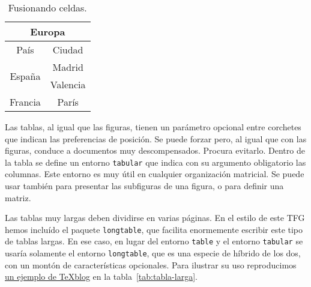 \begin{table}[htb] 
\centering
\begin{tabular}{|c|c|}
\hline
\multicolumn{2}{|c|}{Europa} \\
\hline
País  & Ciudad \\ \hline \hline
\multirow{2}{1.2cm}{España} & Madrid \\ \cline{2-2}
& Valencia \\ \hline
Francia & París \\ \hline
\end{tabular}
\caption{Fusionando celdas.}
\label{tab:dificililla}
\end{table}

Las tablas, al igual que las figuras, tienen un parámetro opcional entre corchetes que indican las preferencias de posición.  Se puede forzar pero, al igual que con las figuras, conduce a documentos muy descompensados.  Procura evitarlo.  Dentro de la tabla se define un entorno \texttt{tabular} que indica con su argumento obligatorio las columnas.  Este entorno es muy útil en cualquier organización matricial.  Se puede usar también para presentar las subfiguras de una figura, o para definir una matriz.

Las tablas muy largas deben dividirse en varias páginas.  En el estilo de este TFG hemos incluído el paquete \texttt{longtable}, que facilita enormemente escribir este tipo de tablas largas.  En ese caso, en lugar del entorno \texttt{table} y el entorno \texttt{tabular} se usaría solamente el entorno \texttt{longtable}, que es una especie de híbrido de los dos, con un montón de características opcionales.  Para ilustrar su uso reproducimos \href{https://texblog.org/2011/05/15/multi-page-tables-using-longtable/}{un ejemplo de TeXblog} en la tabla~\ref{tab:tabla-larga}.

